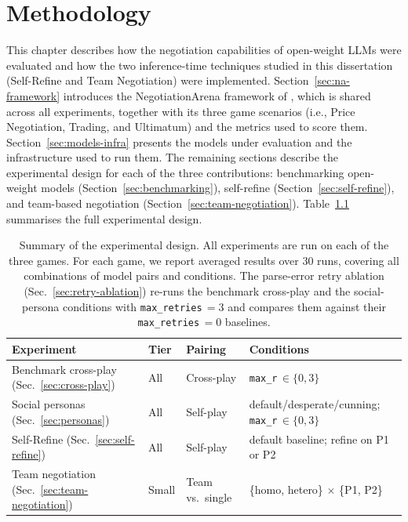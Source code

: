 
\chapter{Methodology} \label{chap:methodology}

This chapter describes how the negotiation capabilities of open-weight \acp{LLM} were evaluated and how the two inference-time techniques studied in this dissertation (Self-Refine and Team Negotiation) were implemented. Section~\ref{sec:na-framework} introduces the NegotiationArena framework of \textcite{bianchi_how_2024}, which is shared across all experiments, together with its three game scenarios (i.e., Price Negotiation, Trading, and Ultimatum) and the metrics used to score them. Section~\ref{sec:models-infra} presents the models under evaluation and the infrastructure used to run them. The remaining sections describe the experimental design for each of the three contributions: benchmarking open-weight models (Section~\ref{sec:benchmarking}), self-refine (Section~\ref{sec:self-refine}), and team-based negotiation (Section~\ref{sec:team-negotiation}). Table~\ref{tab:experiment-design} summarises the full experimental design.

\begin{table}
\centering
\small
\caption{Summary of the experimental design. All experiments are run on each of the three games. For each game, we report averaged results over $30$ runs, covering all combinations of model pairs and conditions. The parse-error retry ablation (Sec.~\ref{sec:retry-ablation}) re-runs the benchmark cross-play and the social-persona conditions with \texttt{max\_retries}\,$=3$ and compares them against their \texttt{max\_retries}\,$=0$ baselines.}
\label{tab:experiment-design}
\begin{tabular}{llll}
\toprule
\textbf{Experiment} & \textbf{Tier} & \textbf{Pairing} & \textbf{Conditions} \\
\midrule
Benchmark cross-play (Sec.~\ref{sec:cross-play})        & All    & Cross-play     & \texttt{max\_r}\,$\in\{0,3\}$   \\
Social personas (Sec.~\ref{sec:personas})               & All & Self-play        & default/desperate/cunning; \texttt{max\_r}\,$\in\{0,3\}$ \\
Self-Refine (Sec.~\ref{sec:self-refine})                & All & Self-play        & default baseline; refine on P1 or P2         \\
Team negotiation (Sec.~\ref{sec:team-negotiation})      & Small  & Team vs.\ single & \{homo, hetero\} $\times$ \{P1, P2\}  \\
\bottomrule
\end{tabular}
\end{table}

